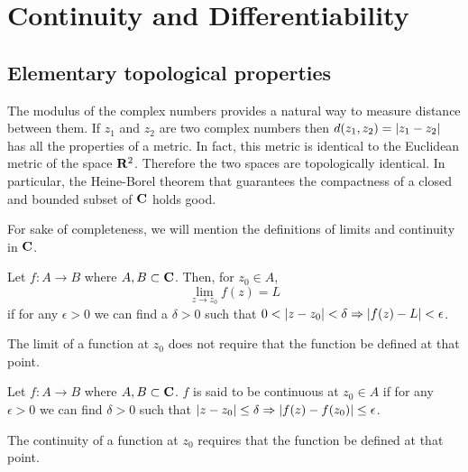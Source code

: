 \chapter{Continuity and Differentiability}\label{c2}
\section{Elementary topological properties}\label{c2s1}
The modulus of the complex numbers provides a natural way to measure distance
between them. If $z_1$ and $z_2$ are two complex numbers then $d(z_1, z_2)
= \left\vert{z_1 - z_2}\right\vert$ has all the properties of a metric. In fact, this metric is
identical to the Euclidean metric of the space $\mathbf{R}^2$. Therefore the two 
spaces are topologically identical. In particular, the Heine-Borel theorem that
guarantees the compactness of a closed and bounded subset of $\mathbf{C}$ holds good.

For sake of completeness, we will mention the definitions of limits and 
continuity in $\mathbf{C}$.

\begin{defn}\label{c2s1d1}
Let $f: A \rightarrow B$ where $A, B \subset \mathbf{C}$. Then, for $z_0 \in A$,
\[
\lim_{z \rightarrow z_0}f(z) = L
\]
if for any $\epsilon > 0$ we can find a $\delta > 0$ such that $0 < \left\vert{z-z_0}\right\vert
< \delta \Rightarrow \left\vert{f(z) - L}\right\vert < \epsilon$.
\end{defn}
\begin{rem}
The limit of a function at $z_0$ does not require that the function be defined 
at that point.
\end{rem}

\begin{defn}\label{c2s1d2}
Let $f: A \rightarrow B$ where $A, B \subset \mathbf{C}$. $f$ is said to be
continuous at $z_0 \in A$ if for any $\epsilon > 0$ we can find $\delta > 0$
such that $\left\vert{z - z_0}\right\vert \le \delta \Rightarrow \left\vert{f(z) - f(z_0)}\right\vert \le 
\epsilon$.
\end{defn}
\begin{rem}
The continuity of a function at $z_0$ requires that the function be defined at
that point.
\end{rem}

